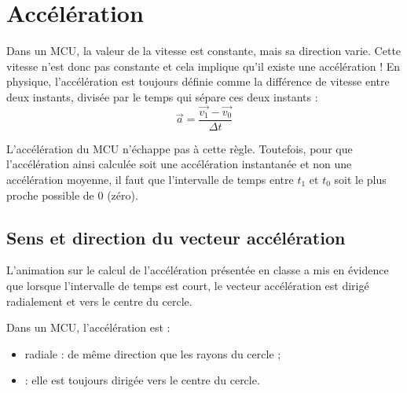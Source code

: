 \chapter{Accélération}
Dans un MCU, la valeur de la vitesse est constante, mais sa direction varie. Cette vitesse n'est donc pas constante et cela implique qu'il existe une accélération !
En physique, l'accélération est toujours définie comme la différence de vitesse entre deux instants, divisée par le temps qui sépare ces deux instants :
\begin{equation*}
    \vec{a}=\frac{\vec{v_1}-\vec{v_0}}{\Delta t}
\end{equation*}

L'accélération du MCU n'échappe pas à cette règle.
Toutefois, pour que l'accélération ainsi calculée soit une accélération instantanée et non une accélération moyenne, il faut que l'intervalle de temps entre \(t_1\) et \(t_0\) soit le plus proche possible de 0 (zéro).

\section{Sens et direction du vecteur accélération}
L'animation sur le calcul de l'accélération présentée en classe a mis en évidence que lorsque l'intervalle de temps est court, le vecteur accélération est dirigé radialement et vers le centre du cercle.

\begin{encadre}
    Dans un MCU, l'accélération est :
    \begin{itemize}[label=\textbullet]
        \item radiale : de même direction que les rayons du cercle ;
        \item {} : elle est toujours dirigée vers le centre du cercle.
    \end{itemize}
\end{encadre}

